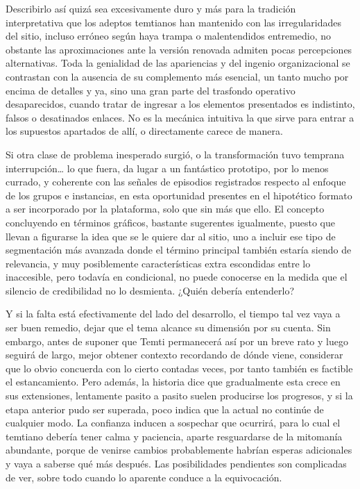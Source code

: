 \documentclass[
]{book}
\begin{document}
Describirlo así quizá sea excesivamente duro y más para la tradición interpretativa que los adeptos temtianos han mantenido con las irregularidades del sitio, incluso erróneo según haya trampa o malentendidos entremedio, no obstante las aproximaciones ante la versión renovada admiten pocas percepciones alternativas. Toda la genialidad de las apariencias y del ingenio organizacional se contrastan con la ausencia de su complemento más esencial, un tanto mucho por encima de detalles y ya, sino una gran parte del trasfondo operativo desaparecidos, cuando tratar de ingresar a los elementos presentados es indistinto, falsos o desatinados enlaces. No es la mecánica intuitiva la que sirve para entrar a los supuestos apartados de allí, o directamente carece de manera.

Si otra clase de problema inesperado surgió, o la transformación tuvo temprana interrupción\ldots{} lo que fuera, da lugar a un fantástico prototipo, por lo menos currado, y coherente con las señales de episodios registrados respecto al enfoque de los grupos e instancias, en esta oportunidad presentes en el hipotético formato a ser incorporado por la plataforma, solo que sin más que ello. El concepto concluyendo en términos gráficos, bastante sugerentes igualmente, puesto que llevan a figurarse la idea que se le quiere dar al sitio, uno a incluir ese tipo de segmentación más avanzada donde el término principal también estaría siendo de relevancia, y muy posiblemente características extra escondidas entre lo inaccesible, pero todavía en condicional, no puede conocerse en la medida que el silencio de credibilidad no lo desmienta. ¿Quién debería entenderlo?

Y si la falta está efectivamente del lado del desarrollo, el tiempo tal vez vaya a ser buen remedio, dejar que el tema alcance su dimensión por su cuenta. Sin embargo, antes de suponer que Temti permanecerá así por un breve rato y luego seguirá de largo, mejor obtener contexto recordando de dónde viene, considerar que lo obvio concuerda con lo cierto contadas veces, por tanto también es factible el estancamiento. Pero además, la historia dice que gradualmente esta crece en sus extensiones, lentamente pasito a pasito suelen producirse los progresos, y si la etapa anterior pudo ser superada, poco indica que la actual no continúe de cualquier modo. La confianza inducen a sospechar que ocurrirá, para lo cual el temtiano debería tener calma y paciencia, aparte resguardarse de la mitomanía abundante, porque de venirse cambios probablemente habrían esperas adicionales y vaya a saberse qué más después. Las posibilidades pendientes son complicadas de ver, sobre todo cuando lo aparente conduce a la equivocación.
\end{document}
